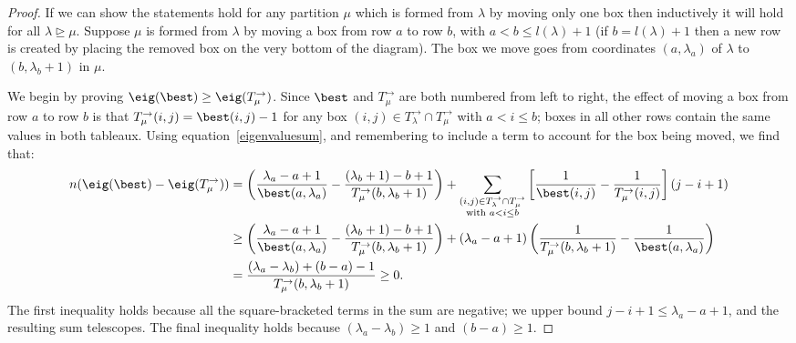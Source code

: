 \documentclass[11pt]{report}
\begin{document}
\begin{proof}
	If we can show the statements hold for any partition $\mu$ which is formed from $\lambda$ by 
	moving only one box then inductively it will hold for all $\lambda \trianglerighteq \mu$.
	Suppose $\mu$ is formed from $\lambda$ by moving a box from row $a$ to row $b$, with $a<b\leq l(\lambda)+1$
	(if $b=l(\lambda)+1$ then a new row is created by placing the removed box on the very bottom of the diagram). 
	The box we move goes from coordinates $(a,\lambda_{a})$ of $\lambda$ to $(b,\lambda_{b}+1)$ in $\mu$. 
	
	We begin by proving $	\eig(\best) \geq  
	\eig(T_\mu^{\rightarrow})$. 
	Since $\best$ and  $T_\mu^\rightarrow$ are both numbered from left to right, the effect of moving a box from row $a$ to row $b$ is that $T_\mu^{\rightarrow}(i,j) = \best(i,j) -1$ for any box $(i,j) \in T_{\lambda}^{\rightarrow} \cap T_{\mu}^{\rightarrow}$  with $a<i\le b$; boxes in all other rows contain the same values in both tableaux. Using equation~\eqref{eigenvaluesum}, and remembering to include a term to account for the box being moved, we find that:
	\begin{align*}
	n(\eig(\best)  -
	\eig(T_\mu^{\rightarrow})) 
	& =  
	\left(\frac{\lambda_{a}-a+1}{\best(a,\lambda_{a})} 
	-\frac{(\lambda_{b}+1)-b+1}{T_\mu^{\rightarrow}(b,\lambda_{b}+1)}\right)  
	+ \sum_{\substack{(i,j) \in T_{\lambda}^{\rightarrow}\cap T_{\mu}^{\rightarrow} \\ \textnormal{with } a < i 
			\leq b}}\left[\frac{1}{\best(i,j)} - 
	\frac{1}{T_\mu^{\rightarrow}(i,j)}\right](j-i+1)\\
	& \geq  \left( \frac{\lambda_{a}-a+1}{\best(a,\lambda_{a})} 
	-\frac{(\lambda_{b}+1)-b+1}{T_\mu^\rightarrow(b,\lambda_b+1)}\right)  + (\lambda_a-a+1)
	\left(\frac{1}{T_\mu^{\rightarrow}(b,\lambda_{b}+1)} - 
	\frac{1}{\best(a,\lambda_{a})}\right)\\
	& =  \frac{(\lambda_{a} -\lambda_{b}) + 
		(b-a) -1}{T_\mu^{\rightarrow}(b,\lambda_{b}+1)} 	\geq 0.
	\end{align*} 
	The first inequality holds because all the square-bracketed terms in the sum are negative; 
	we upper bound $j-i+1 \le \lambda_{a}-a+1$, and the resulting sum telescopes. The final inequality holds because $(\lambda_{a}-\lambda_{b})\ge 1$ and $(b-a)\ge 1$.
	
	
	
	
	
	
	
	
	
	
	

\end{proof}
\end{document}
